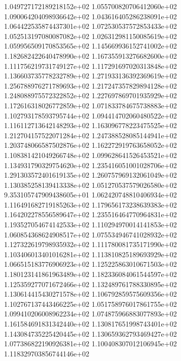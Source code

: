 1.049727172189218152e+02	1.055700820706412060e+02	1.090064204098936642e+02	1.043616405286238091e+02	1.064422535874437301e+02	1.072530537572853433e+02	1.052513197080087082e+02	1.026312981150085619e+02	1.059956509170853565e+02	1.145669936152741002e+02	1.182682422640478990e+02	1.167355913276682600e+02	1.111756219731749127e+02	1.117291697020313848e+02	1.136603735778232789e+02	1.271933136392369619e+02	1.256788976271789693e+02	1.217247357829894128e+02	1.248088975572322852e+02	1.227697869701935929e+02	1.172616318026772859e+02	1.071833784675738883e+02	1.102793178593795744e+02	1.094414702060480522e+02	1.116112713642148293e+02	1.163096778223475525e+02	1.212704157522071284e+02	1.247388528085144941e+02	1.203748066587502876e+02	1.162272919763658052e+02	1.108381421049266748e+02	1.099628641526453521e+02	1.134931790329754620e+02	1.235416051001028706e+02	1.291303572401619135e+02	1.260757969132061049e+02	1.130385258139413338e+02	1.051270537579026580e+02	9.353105747909438605e+01	1.062420748810406934e+02	1.116491682719185263e+02	1.179656173238639383e+02	1.164202278556589647e+02	1.235516464770964831e+02	1.193527054674142533e+02	1.110294970014141853e+02	1.060854368624908517e+02	1.075534946741028932e+02	1.127322619798935932e+02	1.111780081735171990e+02	1.103406013401016281e+02	1.113810825189693929e+02	1.066515183776906923e+02	1.125225863010671503e+02	1.180123141861963489e+02	1.182336084061544597e+02	1.125359277071672466e+02	1.132489761788330895e+02	1.130614415430271578e+02	1.106792859575609356e+02	1.102767137443466225e+02	1.051758976017861755e+02	1.099410206008962234e+02	1.074875966883077893e+02	1.161584691831342440e+02	1.130817651998743401e+02	1.143084735225420445e+02	1.130659362793469427e+02	1.077386822190926381e+02	1.100408307012106945e+02	1.118329703856744146e+02
